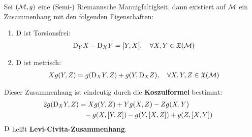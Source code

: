 \begin{satz}
\label{satz:koszulformel}
Sei $(\mathcal{M}, g)$ eine (Semi-) Riemannsche Mannigfaltigkeit, dann existiert auf $\mathcal{M}$ ein Zusammenhang mit den folgenden Eigenschaften:
\begin{enumerate}
\item $\mathrm{D}$ ist Torsionsfrei:
\begin{align}
\covd_Y X - \covd_X Y = \comm{Y}{X}, \quad \forall X, Y \in \mathfrak{X}(\mfk)
\end{align}
\item $\mathrm{D}$ ist metrisch:
\begin{align}
X g(Y, Z) = g(\mathrm{D}_X Y, Z) + g(Y, \mathrm{D}_X Z), \quad \forall X, Y, Z \in \mathfrak{X}(\mathcal{M})
\end{align}
\end{enumerate}
Dieser Zusammenhang ist eindeutig durch die \textbf{Koszulformel} bestimmt:
\begin{align}
2 g (\covd_X Y, Z) &= X g(Y, Z) + Y g(X, Z) - Z g(X, Y)\\
&\phantom{=} - g(X, \comm{Y}{Z}) - g(Y, \comm{X}{Z}) + g(Z, \comm{X}{Y})
\end{align}
$\mathrm{D}$ heißt \textbf{Levi-Civita-Zusammenhang}.
\end{satz}


